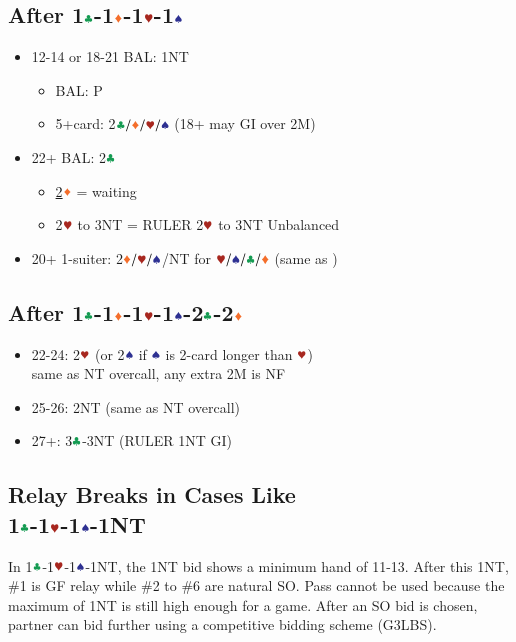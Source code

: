 \documentclass{article}
\begin{document}
\begin{multicols}{2}
\subsection{After 1$\ccc$-1$\ddd$-1$\hhh$-1$\sss$}
\label{sec:1c1d1h1s}
\begin{itemize}
    \item 12-14 or 18-21 BAL: 1NT
    \begin{itemize}
        \item BAL: P
        \item 5+card: 2$\ccc/\ddd/\hhh/\sss$ (18+ may GI over 2M)
    \end{itemize}
    \item 22+ BAL: 2$\ccc$
    \begin{itemize}
        \item \hyperref[sec:1c1d1h1s2c2d]{2$\ddd$} = waiting
        \item 2$\hhh$ to 3NT = RULER 2$\hhh$ to 3NT Unbalanced
    \end{itemize}
    \item 20+ 1-suiter: 2$\ddd/\hhh/\sss$/NT for $\hhh/\sss/\ccc/\ddd$ (same as )
\end{itemize}

\subsection{After 1$\ccc$-1$\ddd$-1$\hhh$-1$\sss$-2$\ccc$-2$\ddd$}
\label{sec:1c1d1h1s2c2d}
\begin{itemize}
    \item 22-24: 2$\hhh$ (or 2$\sss$ if $\sss$ is 2-card longer than $\hhh$) \\
        same as NT overcall, any extra 2M is NF
    \item 25-26: 2NT (same as NT overcall)
    \item 27+: 3$\ccc$-3NT (RULER 1NT GI)
\end{itemize}

\subsection{Relay Breaks in Cases Like \\
1$\ccc$-1$\hhh$-1$\sss$-1NT}
In 1$\ccc$-1$\hhh$-1$\sss$-1NT, the 1NT bid shows a minimum hand of 11-13. After this 1NT, \#1 is GF relay while \#2 to \#6 are natural SO. Pass cannot be used because the maximum of 1NT is still high enough for a game. After an SO bid is chosen, partner can bid further using a competitive bidding scheme (G3LBS).


\end{multicols}
\end{document}
